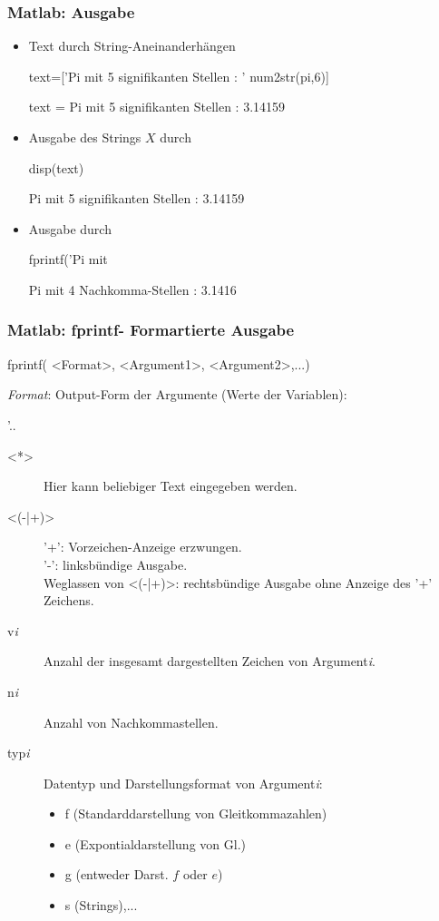 \documentclass[hyperref={xetex}]{beamer}
\begin{document}
%
%
\begin{frame}[fragile]\frametitle{Matlab: Ausgabe}
\begin{itemize}
\item Text durch String-Aneinanderhängen
\begin{matlabin}
text=['Pi mit 5 signifikanten Stellen : ' num2str(pi,6)]
\end{matlabin} 
\begin{matlab} 
text =
Pi mit 5 signifikanten Stellen : 3.14159
\end{matlab} 
\item Ausgabe des Strings $X$ durch  
\begin{matlabin}
disp(text)
\end{matlabin} 
\begin{matlab} 
Pi mit 5 signifikanten Stellen : 3.14159
\end{matlab} 
\item Ausgabe durch  
\begin{matlabin}
fprintf('Pi mit %
\end{matlabin} 
\begin{matlab} 
Pi mit 4 Nachkomma-Stellen : 3.1416 
\end{matlab}
\end{itemize}
\end{frame}
%
%
\begin{frame}[fragile]\frametitle{Matlab: fprintf- Formartierte Ausgabe}
\begin{matlabin}
fprintf( <Format>, <Argument1>, <Argument2>,...)
\end{matlabin}
\textit{Format}: Output-Form der Argumente (Werte der Variablen): 
\begin{matlabin}
'.. %
\end{matlabin} 
\begin{description}
\item [<*>] Hier kann beliebiger Text eingegeben werden.
\item [<(-|+)>] '+': Vorzeichen-Anzeige erzwungen.\\
  '-': linksbündige Ausgabe.\\
 Weglassen von <(-|+)>: rechtsbündige Ausgabe ohne Anzeige des '+' Zeichens.
\item [v\textit{i}] Anzahl der insgesamt dargestellten Zeichen von Argument\textit{i}.
\item [n\textit{i}] Anzahl von Nachkommastellen. 
\item [typ\textit{i}] Datentyp und Darstellungsformat von Argument\textit{i}:
\begin{itemize}
 \item \alert{f} (Standarddarstellung von Gleitkommazahlen)
 \item \alert{e} (Expontialdarstellung von Gl.)
 \item \alert{g} (entweder Darst. $f$ oder $e$)
 \item \alert{s} (Strings),... 
\end{itemize}

\end{description}
\end{frame}
\end{document}
